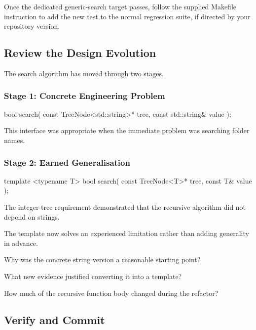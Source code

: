 \documentclass{csc2059practical}
\begin{document}
Once the dedicated generic-search target passes, follow the supplied Makefile
instruction to add the new test to the normal regression suite, if directed by
your repository version.

\subsection{Review the Design Evolution}

The search algorithm has moved through two stages.

\subsubsection*{Stage 1: Concrete Engineering Problem}

\begin{cppcode}
bool search(
    const TreeNode<std::string>* tree,
    const std::string& value
);
\end{cppcode}

This interface was appropriate when the immediate problem was searching folder
names.

\subsubsection*{Stage 2: Earned Generalisation}

\begin{cppcode}
template <typename T>
bool search(
    const TreeNode<T>* tree,
    const T& value
);
\end{cppcode}

The integer-tree requirement demonstrated that the recursive algorithm did not
depend on strings.

The template now solves an experienced limitation rather than adding
generality in advance.

\begin{reflectionbox}
Why was the concrete string version a reasonable starting point?

What new evidence justified converting it into a template?

How much of the recursive function body changed during the refactor?
\end{reflectionbox}

\subsection{Verify and Commit}
\end{document}
